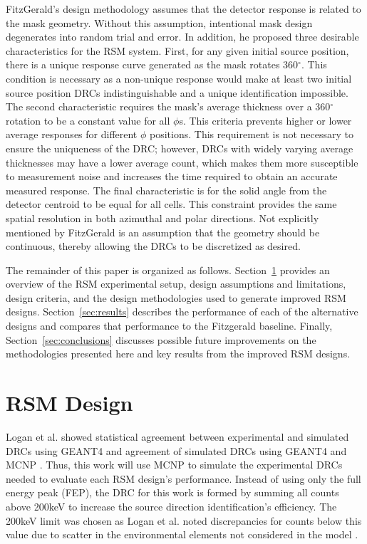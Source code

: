 \documentclass[3p,times]{elsarticle}
\begin{document}
FitzGerald's design methodology assumes that the detector response is related to the mask geometry.  
Without this assumption, intentional mask design degenerates into random trial and error.
In addition, he proposed three desirable characteristics for the RSM system.  
First, for any given initial source position, there is a unique response curve generated as the mask rotates 360$^\circ$.  
This condition is necessary as a non-unique response would make at least two initial source position DRCs indistinguishable and a unique identification impossible.
The second characteristic requires the mask's average thickness over a 360$^\circ$ rotation to be a constant value for all $\phi$s.  
This criteria prevents higher or lower average responses for different $\phi$ positions. 
This requirement is not necessary to ensure the uniqueness of the DRC; however, DRCs with widely varying average thicknesses may have a lower average count, which makes them more susceptible to measurement noise and increases the time required to obtain an accurate measured response.
The final characteristic is for the solid angle from the detector centroid to be equal for all cells.  
This constraint provides the same spatial resolution in both azimuthal and polar directions.
Not explicitly mentioned by FitzGerald is an assumption that the geometry should be continuous, thereby allowing the DRCs to be discretized as desired.

The remainder of this paper is organized as follows.
Section~\ref{sec:rsm-design} provides an overview of the RSM experimental setup, design assumptions and limitations, design criteria, and the design methodologies used to generate improved RSM designs. 
Section~\ref{sec:results} describes the performance of each of the alternative designs and compares that performance to the Fitzgerald baseline.  
Finally, Section~\ref{sec:conclusions} discusses possible future improvements on the methodologies presented here and key results from the improved RSM designs. 

\section{RSM Design} \label{sec:rsm-design}
Logan et al.\cite{Logan2017_2} showed statistical agreement between experimental and simulated DRCs using GEANT4 \cite{Agostinelli03} and agreement of simulated DRCs \cite{Logan2017} using GEANT4 and MCNP \cite{Goorley13}.
Thus, this work will use MCNP to simulate the experimental DRCs needed to evaluate each RSM design's performance.  
Instead of using only the full energy peak (FEP), the DRC for this work is formed by summing all counts above 200keV to increase the source direction identification's efficiency.  
The 200keV limit was chosen as Logan et al. noted discrepancies for counts below this value due to scatter in the environmental elements not considered in the model \cite{Logan2017}.
\end{document}
